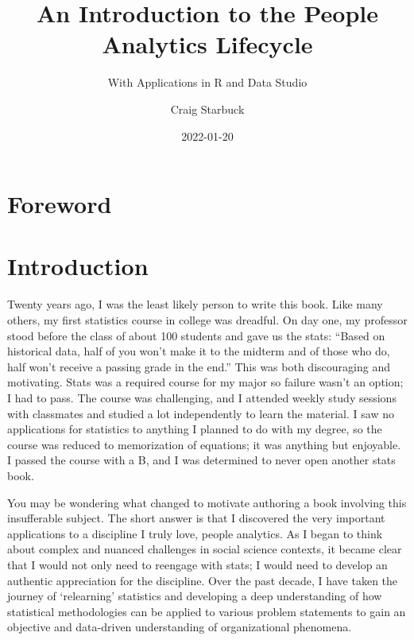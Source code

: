 \documentclass[]{book}
\title{An Introduction to the People Analytics Lifecycle}
\subtitle{With Applications in R and Data Studio}
\author{Craig Starbuck}
\date{2022-01-20}
\begin{document}
\maketitle

{
\setcounter{tocdepth}{1}
\tableofcontents
}
\hypertarget{foreword}{%
\chapter{Foreword}\label{foreword}}

\hypertarget{introduction}{%
\chapter{Introduction}\label{introduction}}

Twenty years ago, I was the least likely person to write this book. Like many others, my first statistics course in college was dreadful. On day one, my professor stood before the class of about 100 students and gave us the stats: ``Based on historical data, half of you won't make it to the midterm and of those who do, half won't receive a passing grade in the end.'' This was both discouraging and motivating. Stats was a required course for my major so failure wasn't an option; I had to pass. The course was challenging, and I attended weekly study sessions with classmates and studied a lot independently to learn the material. I saw no applications for statistics to anything I planned to do with my degree, so the course was reduced to memorization of equations; it was anything but enjoyable. I passed the course with a B, and I was determined to never open another stats book.

You may be wondering what changed to motivate authoring a book involving this insufferable subject. The short answer is that I discovered the very important applications to a discipline I truly love, people analytics. As I began to think about complex and nuanced challenges in social science contexts, it became clear that I would not only need to reengage with stats; I would need to develop an authentic appreciation for the discipline. Over the past decade, I have taken the journey of `relearning' statistics and developing a deep understanding of how statistical methodologies can be applied to various problem statements to gain an objective and data-driven understanding of organizational phenomena.
\end{document}
